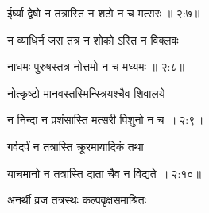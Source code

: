 
{\devanagarifont ईर्ष्या द्वेषो न तत्रास्ति न शठो न च मत्सरः {॥ २:\hspace{.11em}७॥} \veg\dontdisplaylinenum }%

{\devanagarifont न व्याधिर्न जरा तत्र न शोको ऽस्ति न विक्लवः \thinspace{\dandab} \dontdisplaylinenum }%


{\devanagarifont नाधमः पुरुषस्तत्र नोत्तमो न च मध्यमः {॥ २:\hspace{.11em}८॥} \veg\dontdisplaylinenum }%
 
{\devanagarifont नोत्कृष्टो मानवस्तस्मिन्स्त्रियश्चैव शिवालये \thinspace{\dandab} \dontdisplaylinenum }%


{\devanagarifont न निन्दा न प्रशंसास्ति मत्सरी पिशुनो न च {॥ २:\hspace{.11em}९॥} \veg\dontdisplaylinenum }%

{\devanagarifont गर्वदर्पं न तत्रास्ति क्रूरमायादिकं तथा \thinspace{\dandab} \dontdisplaylinenum }%
 

{\devanagarifont याचमानो न तत्रास्ति दाता चैव न विद्यते {॥ २:\hspace{.11em}१०॥} \veg\dontdisplaylinenum }%

\pend
\endnumbering
\vfill\pagebreak\beginnumbering\pstart
\vers

{\devanagarifont अनर्थी व्रज तत्रस्थः कल्पवृक्षसमाश्रितः \thinspace{\dandab} \dontdisplaylinenum }%


